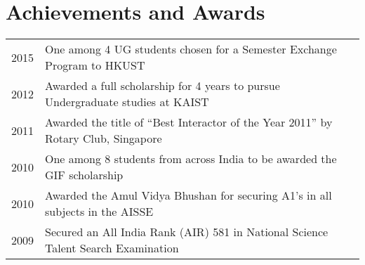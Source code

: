 \documentclass[]{deedy-resume-openfont}
\begin{document}
\begin{minipage}[t]{0.66\textwidth}


\section{Achievements and Awards} 
\begin{tabular}{rll}
2015     & One among 4 UG students chosen for a Semester Exchange Program to HKUST\\ 
2012     & Awarded a full scholarship for 4 years to pursue Undergraduate studies at KAIST\\
2011     & Awarded the title of “Best Interactor of the Year 2011” by Rotary Club, Singapore\\ 
2010     & One among 8 students from across India to be awarded the GIF scholarship\\
2010     & Awarded the Amul Vidya Bhushan for securing A1’s in all subjects in the AISSE\\
2009     & Secured an All India Rank (AIR) 581 in National Science Talent Search Examination\\  

\end{tabular}
\sectionsep\textbf{}


\end{minipage} 
\end{document}
